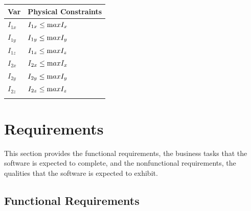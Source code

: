\documentclass[12pt]{article}
\begin{document}
\begin{table}[!h]
\caption{Output Variables} \label{TblOutputVar}
\renewcommand{\arraystretch}{1.2}
\noindent \begin{longtable*}{l l} 
  \toprule
  \textbf{Var} & \textbf{Physical Constraints} \\
  \midrule 
   $I_{1x}$ & $I_{1x} \leq \text maxI_{x}$\\
   $I_{1y}$ & $I_{1y} \leq \text maxI_{y}$\\
   $I_{1z}$ & $I_{1z} \leq \text maxI_{z}$\\
   $I_{2x}$ & $I_{2x} \leq \text maxI_{x}$\\
   $I_{2y}$ & $I_{2y} \leq \text maxI_{y}$\\
   $I_{2z}$ & $I_{2z} \leq \text maxI_{z}$\\
  \\
  \bottomrule
\end{longtable*}
\end{table}


\section{Requirements}

This section provides the functional requirements, the business tasks that the
software is expected to complete, and the nonfunctional requirements, the
qualities that the software is expected to exhibit.

\subsection{Functional Requirements}
\end{document}
